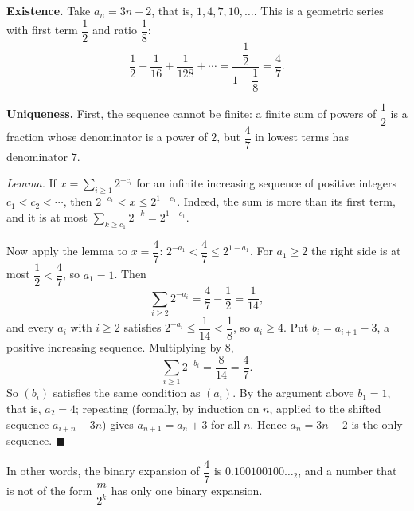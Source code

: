 \textbf{Existence.} Take $a_n=3n-2$, that is, $1,4,7,10,\dots$. This is a geometric series with first term $\dfrac{1}{2}$ and ratio $\dfrac{1}{8}$:
\[
\dfrac{1}{2}+\dfrac{1}{16}+\dfrac{1}{128}+\cdots=\dfrac{\dfrac{1}{2}}{1-\dfrac{1}{8}}=\dfrac{4}{7}.
\]

\textbf{Uniqueness.} First, the sequence cannot be finite: a finite sum of powers of $\dfrac{1}{2}$ is a fraction whose denominator is a power of $2$, but $\dfrac{4}{7}$ in lowest terms has denominator $7$.

\emph{Lemma.} If $x=\sum_{i\ge1}2^{-c_i}$ for an infinite increasing sequence of positive integers $c_1<c_2<\cdots$, then $2^{-c_1}<x\le2^{1-c_1}$. Indeed, the sum is more than its first term, and it is at most $\sum_{k\ge c_1}2^{-k}=2^{1-c_1}$.

Now apply the lemma to $x=\dfrac{4}{7}$: $2^{-a_1}<\dfrac{4}{7}\le2^{1-a_1}$. For $a_1\ge2$ the right side is at most $\dfrac{1}{2}<\dfrac{4}{7}$, so $a_1=1$. Then
\[
\sum_{i\ge2}2^{-a_i}=\dfrac{4}{7}-\dfrac{1}{2}=\dfrac{1}{14},
\]
and every $a_i$ with $i\ge2$ satisfies $2^{-a_i}\le\dfrac{1}{14}<\dfrac{1}{8}$, so $a_i\ge4$. Put $b_i=a_{i+1}-3$, a positive increasing sequence. Multiplying by $8$,
\[
\sum_{i\ge1}2^{-b_i}=\dfrac{8}{14}=\dfrac{4}{7} .
\]
So $(b_i)$ satisfies the same condition as $(a_i)$. By the argument above $b_1=1$, that is, $a_2=4$; repeating (formally, by induction on $n$, applied to the shifted sequence $a_{i+n}-3n$) gives $a_{n+1}=a_n+3$ for all $n$. Hence $a_n=3n-2$ is the only sequence. $\blacksquare$

In other words, the binary expansion of $\dfrac{4}{7}$ is $0.100100100\ldots_2$, and a number that is not of the form $\dfrac{m}{2^k}$ has only one binary expansion.
